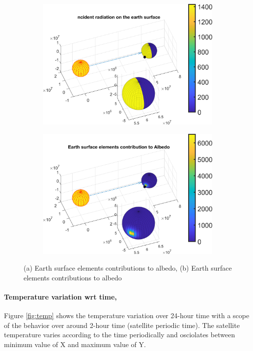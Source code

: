 \documentclass[11pt]{article}
\begin{document}
\begin{figure}
    \centering
    \begin{subfigure}[b]{0.48\textwidth}
        \includegraphics[width=\textwidth]{Matlab/images/inc_sun_rad.png}
        \caption{}
        \label{fig:solar-rad-on-earth}
    \end{subfigure}
    \begin{subfigure}[b]{0.48\textwidth}
        \includegraphics[width=\textwidth]{Matlab/images/albedo_elements.png}
        \caption{}
        \label{fig:albedo}
    \end{subfigure}
    \caption{(a) Earth surface elements contributions to albedo, (b) Earth surface elements contributions to albedo}
\end{figure}
\paragraph{Temperature variation wrt time,}
Figure \ref{fig:temp} shows the temperature variation over 24-hour time with a scope of the behavior over around 2-hour time (satellite periodic time). The satellite temperature varies according to the time periodically and osciolates between minimum value of X and maximum value of Y.  
\end{document}
